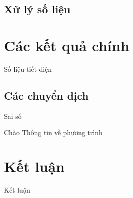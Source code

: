 \documentclass[11pt, hyperref={unicode}]{beamer}
\begin{document}
\subsection{Xử lý số liệu}

\section{Các kết quả chính}
\begin{frame}{Số liệu tiết diện}
\end{frame}

\subsection{Các chuyển dịch}
\begin{frame}{Sai số}
\begin{block}{Chào}
Thông tin về phương trình
\end{block}
\end{frame}

\section{Kết luận}
\begin{frame}{Kết luận}
\end{frame}
\end{document}
